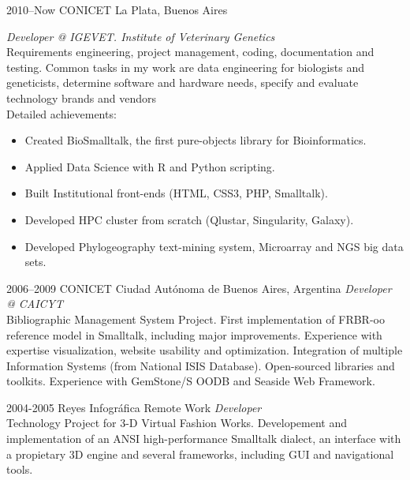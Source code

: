 \documentclass[]{friggeri-cv} %
\begin{document}
\begin{entrylist}


\entry
{2010--Now}
{CONICET}
{La Plata, Buenos Aires}
{\emph{Developer @ IGEVET. Institute of Veterinary Genetics} \\
Requirements engineering, project management, 
coding, documentation and testing. Common tasks in my work are data engineering
for biologists and geneticists, determine software and hardware needs, specify and evaluate
technology brands and vendors \\
Detailed achievements:
\begin{itemize}
\item Created BioSmalltalk, the first pure-objects library for Bioinformatics.
\item Applied Data Science with R and Python scripting.
\item Built Institutional front-ends (HTML, CSS3, PHP, Smalltalk). 
\item Developed HPC cluster from scratch (Qlustar, Singularity, Galaxy).
\item Developed Phylogeography text-mining system, Microarray and NGS big data sets.
\end{itemize}}

\entry
{2006--2009}
{CONICET}
{Ciudad Autónoma de Buenos Aires, Argentina}
{\emph{Developer @ CAICYT} \\
Bibliographic Management System Project. First implementation of FRBR-oo reference model in Smalltalk, including major improvements. Experience with expertise visualization, website usability and optimization. Integration of multiple Information Systems (from National ISIS Database). Open-sourced libraries and toolkits. Experience with GemStone/S OODB and Seaside Web Framework.}



\entry
{2004-2005}
{Reyes Infográfica}
{Remote Work}
{\emph{Developer} \\
Technology Project for 3-D Virtual Fashion Works. Developement and implementation of an ANSI high-performance Smalltalk dialect, an interface with a propietary 3D engine and several frameworks, including GUI and navigational tools.}


\end{entrylist}
\end{document}
